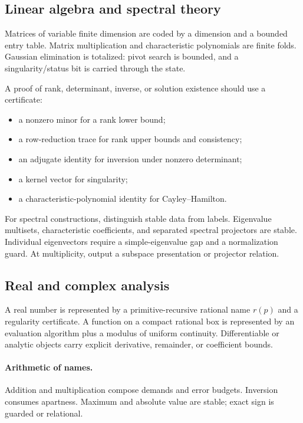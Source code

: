 \subsection{Linear algebra and spectral theory}

Matrices of variable finite dimension are coded by a dimension and a bounded entry table.  Matrix multiplication and characteristic polynomials are finite folds.  Gaussian elimination is totalized: pivot search is bounded, and a singularity/status bit is carried through the state.

A proof of rank, determinant, inverse, or solution existence should use a certificate:

\begin{itemize}
\item a nonzero minor for a rank lower bound;
\item a row-reduction trace for rank upper bounds and consistency;
\item an adjugate identity for inversion under nonzero determinant;
\item a kernel vector for singularity;
\item a characteristic-polynomial identity for Cayley--Hamilton.
\end{itemize}

For spectral constructions, distinguish stable data from labels.  Eigenvalue multisets, characteristic coefficients, and separated spectral projectors are stable.  Individual eigenvectors require a simple-eigenvalue gap and a normalization guard.  At multiplicity, output a subspace presentation or projector relation.

\subsection{Real and complex analysis}

A real number is represented by a primitive-recursive rational name \(r(p)\) and a regularity certificate.  A function on a compact rational box is represented by an evaluation algorithm plus a modulus of uniform continuity.  Differentiable or analytic objects carry explicit derivative, remainder, or coefficient bounds.

\paragraph{Arithmetic of names.}
Addition and multiplication compose demands and error budgets.  Inversion consumes apartness.  Maximum and absolute value are stable; exact sign is guarded or relational.

